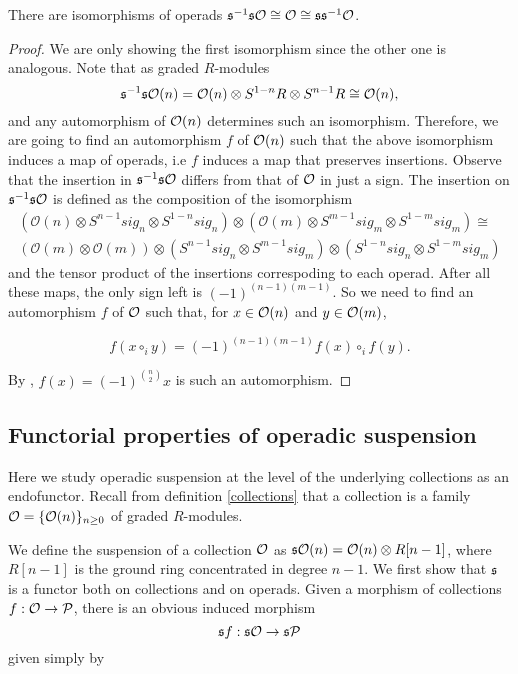 \documentclass[join.tex]{subfiles}
\begin{document}
\begin{lem}\label{suspiso}
There are isomorphisms of operads $\mathfrak{s}^{-1}\mathfrak{s}{\mathcal O}\cong{\mathcal O}\cong\mathfrak{s}\mathfrak{s}^{-1}{\mathcal O}$.
\end{lem}
\begin{proof}
We are only showing the first isomorphism since the other one is analogous. Note that as graded $R$-modules \[\mathfrak{s}^{-1}\mathfrak{s}{\mathcal O}(n)= {\mathcal O}(n)\otimes S^{1-n}R\otimes S^{n-1}R\cong{\mathcal O}(n),\] 
and any automorphism of ${\mathcal O}(n)$ determines such an isomorphism. Therefore, we are going to find an automorphism $f$ of ${\mathcal O}(n)$ such that the above isomorphism induces a map of operads, i.e $f$ induces a map that preserves insertions. Observe that the insertion in $\mathfrak{s}^{-1}\mathfrak{s}{\mathcal O}$ differs from that of ${\mathcal O}$ in just a sign. The insertion on $\mathfrak{s}^{-1}\mathfrak{s}{\mathcal O}$ is defined as the composition of the isomorphism
\begin{align*}
(\mathcal{O}(n)\otimes S^{n-1}sig_n\otimes S^{1-n}sig_n)\otimes (\mathcal{O}(m)\otimes S^{m-1}sig_m\otimes S^{1-m}sig_m)\cong\\ (\mathcal{O}(m)\otimes \mathcal{O}(m))\otimes (S^{n-1}sig_n\otimes S^{m-1}sig_m)\otimes (S^{1-n}sig_n\otimes S^{1-m}sig_m)
\end{align*}
and the tensor product of the insertions correspoding to each operad. After all these maps, the only sign left is $(-1)^{(n-1)(m-1)}$. So we need to find an automorphism $f$ of ${\mathcal O}$ such that, for $x\in{\mathcal O}(n)$ and $y\in{\mathcal O}(m)$,

\[f(x\circ_i y)=(-1)^{(n-1)(m-1)}f(x)\circ_i f(y).\]

By , $f(x)=(-1)^{\binom{n}{2}}x$ is such an automorphism.
\end{proof}


\subsection{Functorial properties of operadic suspension}\label{functorial}


Here we study operadic suspension at the level of the underlying collections as an endofunctor. Recall from definition \ref{collections} that a collection is a family ${\mathcal O}=\{{\mathcal O}(n)\}_{n\geq 0}$ of graded $R$-modules.

We define the suspension of a collection ${\mathcal O}$ as $\mathfrak{s}{\mathcal O}(n)={\mathcal O}(n)\otimes R[n-1]$, where $R[n-1]$ is the ground ring concentrated in degree $n-1$. We first show that $\mathfrak{s}$ is a functor both on collections and on operads.%
Given a morphism of collections $f:{\mathcal O}\to\mathcal{P}$, there is an obvious induced morphism \[\mathfrak{s} f:\mathfrak{s}{\mathcal O}\to\mathfrak{s}\mathcal{P}\] given simply by 
\end{document}
